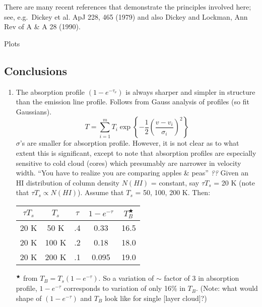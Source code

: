 \documentclass[11pt]{article}
\newcommand{\mar}[1]{\hspace{0pt}\marginpar{-\textcolor{black}{#1}-}}
\newcommand{\mynotes}[1]{{\fontfamily{cmss}\selectfont \textit{#1}}}
\begin{document}
There are many recent references that demonstrate the principles
involved here; see, e.g.\
Dickey et al. ApJ 228, 465 (1979) and also
Dickey and Lockman, Ann Rev of A \& A 28 (1990).

\mar{44}Plots

\subsection{Conclusions}
\mar{45}
\begin{enumerate}[itemsep=1ex, parsep=0.5ex]
    \item The absorption profile $(1 - {e}^{-\tau_{\nu}})$ is always
        sharper and simpler in structure than the emission line profile.
        Follows from Gauss analysis of profiles (so fit Gaussians).
        \[
            T = \sum_{i=1}^{m}{
                T_{i} \exp \left\{ -\frac{1}{2} \left(
                    \frac{v - v_{i}}{\sigma_{i}} \right)^{2}
                \right\}}
            \]
        $\sigma$'s are smaller for absorption profile. However, it is not
        clear as to what extent this is significant, except to note that
        absorption profiles are especially sensitive to cold cloud (cores)
        which presumably are narrower in velocity width.
        ``You have to realize you are comparing apples \& peas'' \mynotes{??}
        Given an HI distribution of column density $N(HI)$ = constant, say
        $\tau T_{s}$ = 20 K (note that $\tau T_{s} \propto N(HI)$).
        Assume that $T_{s}$ = 50, 100, 200 K. Then:
        \begin{center}
            \begin{tabular}{c c c c c}
                $\tau T_{s}$ & $T_{s}$ & $\tau$ & $1-e^{-\tau}$
                & $T_{B}^{\bigstar}$\\
                \hline
                20 K & 50 K & .4 & 0.33 & 16.5\\
                20 K & 100 K & .2 & 0.18 & 18.0\\
                20 K & 200 K & .1 & 0.095 & 19.0\\
            \end{tabular}
        \end{center}
        $^{\bigstar}$ from $T_{B} = T_{s} (1-e^{-\tau})$. So a variation of $\sim$
        factor of 3 in absorption profile, $1-e^{-\tau}$ corresponds to
        variation of only 16\% in $T_{B}$. (Note: what would shape of
        $(1-e^{-\tau})$ and $T_{B}$ look like for single [layer cloud]?)


\end{enumerate}
\end{document}
